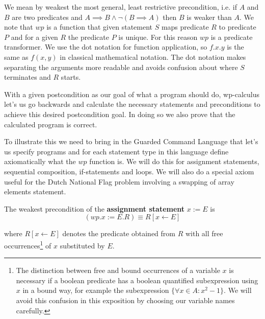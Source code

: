 We mean by weakest the most general, least restrictive precondition, i.e. if $A$ and $B$ are two predicates and $A \implies B \wedge \lnot (B \implies A)$ then $B$ is weaker than $A$. We note that $wp$ is a function that given statement $S$ maps predicate $R$ to predicate $P$ and for a given $R$ the predicate $P$ is unique. For this reason $wp$ is a predicate transformer. We use the dot notation for function application, so $f.x.y$ is the same as $f(x, y)$ in classical mathematical notation. The dot notation makes separating the arguments more readable and avoids confusion about where $S$ terminates and $R$ starts.
 

With a given postcondition as our goal of what a program should do, wp-calculus let's us go backwards and calculate the necessary statements and preconditions to achieve this desired postcondition goal. In doing so we also prove that the calculated program is correct.

To illustrate this we need to bring in the Guarded Command Language that let's us specify programs and for each statement type in this language define axiomatically what the $wp$ function is. We will do this for assignment statements, sequential composition, if-statements and loops. We will also do a special axiom useful for the Dutch National Flag problem involving a swapping of array elements statement.

\begin{defn}
The weakest precondition of the \textbf{assignment statement} $x := E$ is 
$$
(wp.x := E.R) \equiv R[x \leftarrow E] 
$$

where $R[x \leftarrow E]$ denotes the predicate obtained from $R$ with all free occurrences\footnote{The distinction between free and bound occurrences of a variable $x$ is necessary if a boolean predicate has a boolean quantified subexpression using $x$ in a bound way, for example the subexpression $\{\forall x \in A: x^2 - 1\}$. We will avoid this confusion in this exposition by choosing our variable names carefully.} of $x$ substituted by $E$.
\end{defn}


